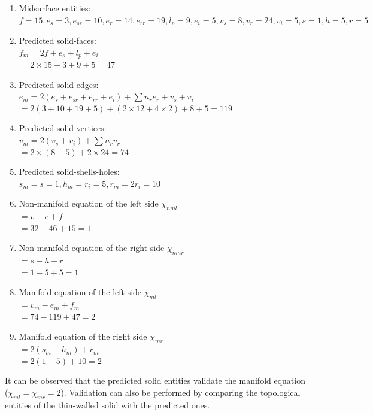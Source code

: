 \begin{enumerate}
[noitemsep,topsep=2pt,parsep=2pt,partopsep=2pt,label=\textbullet]
\item Midsurface entities: \\$f = 15, e_s = 3, e_{sr} = 10, e_r = 14, e_{rr} = 19, l_p = 9 ,e_i=5,v_s = 8,v_r =24, v_i= 5, s=1,h=5,r=5$
\item Predicted solid-faces: \\$f_m = 2f+e_s+ l_p +e_i $\\$= 2 \times 15 + 3 + 9 + 5 = 47$
\item Predicted solid-edges: \\ $e_m = 2(e_s+e_{sr}+e_{rr}+e_i )+ \sum n_{r} e_{r}+v_s+v_i $\\$= 2(3+10+19 + 5)+ (2\times 12 + 4 \times 2)+8+5 = 119$
\item Predicted solid-vertices: \\$v_m = 2(v_s+ v_i) + \sum n_{r} v_r$\\$=2\times (8 + 5)  + 2 \times 24=74$
\item Predicted solid-shells-holes: \\$s_m =s = 1, h_m = r_i  = 5, r_m = 2r_i = 10$
\item Non-manifold equation of the left side  $\chi_{nml} $\\$= v-e+f $\\$= 32-46+15 = 1$
\item Non-manifold equation of the  right side  $\chi_{nmr}$\\$=s-h+r$\\$=1-5+5 = 1$
\item Manifold equation of the  left side  $\chi_{ml} $\\$= v_m-e_m+f_m $\\$=74-119+47= 2$
\item Manifold equation of the  right side  $\chi_{mr}$\\$=2(s_m-h_m )+r_m$\\$= 2(1-5)+10 = 2$
\end{enumerate}
It can be observed that the predicted solid entities validate the manifold equation ($\chi_{ml} = \chi_{mr} = 2$). Validation can also be performed by comparing the  topological entities of the thin-walled solid with the predicted ones.
